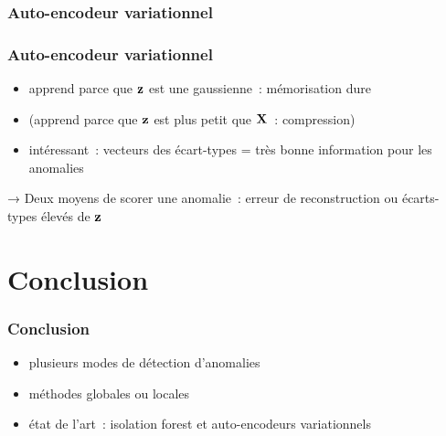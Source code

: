 \documentclass{formation}
\begin{document}
\begin{frame}
  \frametitle{Auto-encodeur variationnel}
\end{frame}

\begin{frame}
  \frametitle{Auto-encodeur variationnel}
  \begin{itemize}
  \item apprend parce que $\vect{z}$ est une gaussienne : mémorisation
    dure
  \item (apprend parce que $\vect{z}$ est plus petit que $\vect{X}$ :
    compression)
  \item intéressant : vecteurs des écart-types = très bonne
    information pour les anomalies
  \end{itemize}
  → Deux moyens de scorer une anomalie : erreur de reconstruction ou
  écarts-types élevés de $\vect{z}$
\end{frame}
\section{Conclusion}

\begin{frame}
  \frametitle{Conclusion}

  \begin{itemize}
  \item plusieurs modes de détection d'anomalies
  \item méthodes globales ou locales
  \item état de l'art : isolation forest et auto-encodeurs
    variationnels
  \end{itemize}
\end{frame}
\end{document}
